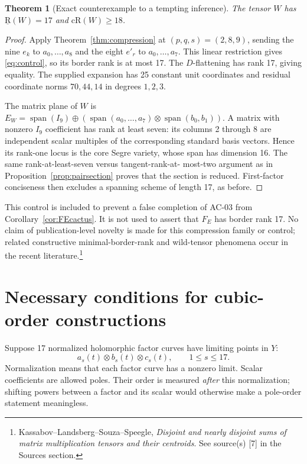 \documentclass[11pt]{article}
\newtheorem{theorem}{Theorem}[section]
\theoremstyle{definition}\newtheorem{definition}[theorem]{Definition}
\theoremstyle{remark}\newtheorem{remark}[theorem]{Remark}
\newcommand{\br}{\underline{\mathrm R}}
\newcommand{\crk}{\mathrm{cR}}
\newcommand{\Span}{\operatorname{span}}
\newcommand{\src}[2]{\footnote{#1. See source(s) [#2] in the Sources section.}}
\begin{document}
\begin{theorem}[Exact counterexample to a tempting inference]\label{thm:wild}
The tensor $W$ has $\br(W)=17$ and $\crk(W)\geq18$.
\end{theorem}
\begin{proof}
Apply Theorem~\ref{thm:compression} at $(p,q,s)=(2,8,9)$, sending the nine
$e_k$ to $a_0,\ldots,a_8$ and the eight $e'_r$ to $a_0,\ldots,a_7$. This
linear restriction gives \eqref{eq:control}, so its border rank is at most 17.
The $D$-flattening has rank 17, giving equality. The supplied expansion has
25 constant unit coordinates and residual coordinate norms $70,44,14$ in
degrees $1,2,3$.

The matrix plane of $W$ is
$E_W=\Span(I_9)\oplus(\Span(a_0,\ldots,a_7)\otimes\Span(b_0,b_1))$.
A matrix with nonzero $I_9$ coefficient has rank at least seven: its columns
2 through 8 are independent scalar multiples of the corresponding standard
basis vectors. Hence its rank-one locus is the core Segre variety, whose
span has dimension 16. The same rank-at-least-seven versus tangent-rank-at-
most-two argument as in Proposition~\ref{prop:pairsection} proves that the
section is reduced. First-factor conciseness then excludes a spanning
scheme of length 17, as before.
\end{proof}

This control is included to prevent a false completion of AC-03 from
Corollary~\ref{cor:FEcactus}. It is not used to assert that $F_E$ has border
rank 17. No claim of publication-level novelty is made for this compression
family or control; related constructive minimal-border-rank and wild-tensor
phenomena occur in the recent literature.\src{Kassabov--Landsberg--Souza--Speegle,
\emph{Disjoint and nearly disjoint sums of matrix multiplication tensors and
their centroids}}{7}

\section{Necessary conditions for cubic-order constructions}

Suppose 17 normalized holomorphic factor curves have limiting points in $Y$:
\[
 a_s(t)\otimes b_s(t)\otimes c_s(t),\qquad 1\leq s\leq17.
\]
Normalization means that each factor curve has a nonzero limit. Scalar
coefficients are allowed poles. Their order is measured \emph{after} this
normalization; shifting powers between a factor and its scalar would
otherwise make a pole-order statement meaningless.
\end{document}
